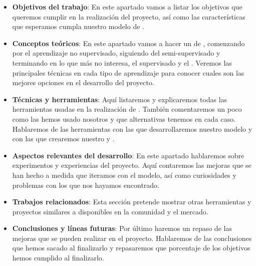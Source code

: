 \begin{itemize}
  \item \textbf{Objetivos del trabajo}: En este apartado vamos a listar los objetivos que queremos cumplir en la realización del proyecto, así como las características que esperamos cumpla nuestro modelo de .
  \item \textbf{Conceptos teóricos}: En este apartado vamos a hacer un  de , comenzando por el aprendizaje no supervisado, siguiendo del semi-supervisado y terminando en lo que más no interesa, el supervisado y el . Veremos las principales técnicas en cada tipo de aprendizaje para conocer cuales son las mejores opciones en el desarrollo del proyecto.
  \item \textbf{Técnicas y herramientas}: Aquí listaremos y explicaremos todas las herramientas usadas en la realización de . También comentaremos un poco como las hemos usado nosotros y que alternativas tenemos en cada caso. Hablaremos de las herramientas con las que desarrollaremos nuestro modelo y con las que crearemos nuestro  y .
  \item \textbf{Aspectos relevantes del desarrollo}: En este apartado hablaremos sobre experimentos y experiencias del proyecto. Aquí contaremos las mejoras que se han hecho a medida que iteramos con el modelo, así como curiosidades y problemas con los que nos hayamos encontrado.
  \item \textbf{Trabajos relacionados}: Esta sección pretende mostrar otras herramientas y proyectos similares a  disponibles en la comunidad y el mercado.
  \item \textbf{Conclusiones y líneas futuras}: Por último haremos un repaso de las mejoras que se pueden realizar en el proyecto. Hablaremos de las conclusiones que hemos sacado al finalizarlo y repasaremos que porcentaje de los objetivos hemos cumplido al finalizarlo.
\end{itemize}
